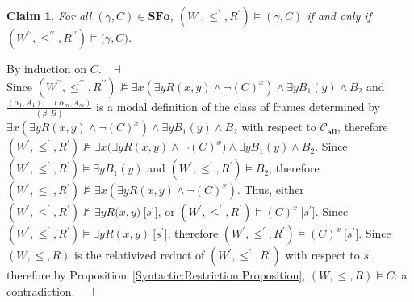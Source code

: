 \documentclass[draft]{article}
\newtheorem{claim}{Claim}
\newenvironment{proof}{{\bf Proof:}}{~$\dashv$\\}
\def\SFo{\mathbf{SFo}}
\def\allfra{\mathbf{all}}
\begin{document}
\begin{proof}
%
%
\begin{claim}
%
%
For all $(\gamma,C){\in}\SFo$, $(W^{\prime},{\leq^{\prime}},{R^{\prime}}){\models}(\gamma,C)$ if and only if $(W^{\prime\prime},{\leq^{\prime\prime}},{R^{\prime\prime}}){\models}(\gamma,
%
%
%
%
%
%
%
$\linebreak$
%
%
%
%
%
%
C)$.
%
%
\end{claim}
%
%
\begin{proof}
%
%
By induction on $C$.
%
%
\medskip
%
%
\end{proof}
%
%
Since $(W^{\prime\prime},{\leq^{\prime\prime}},{R^{\prime\prime}}){\not\models}{\exists x}({\exists y}R(x,y){\wedge}{\neg}(C)^{x}){\wedge}{\exists y}B_{1}(y){\wedge}B_{2}$ and $\frac{(\alpha_{1},A_{1})\ \ldots\ (\alpha_{m},A_{m})}{(\beta,B)}$ is a modal definition of the class of frames determined by ${\exists x}({\exists y}R(x,y){\wedge}{\neg}(C)^{x}){\wedge}
%
%
%
%
%
%
%
$\linebreak$
%
%
%
%
%
%
{\exists y}B_{1}(y){\wedge}B_{2}$ with respect to ${\mathcal C}_{\allfra}$, therefore $(W^{\prime},{\leq^{\prime}},{R^{\prime}}){\not\models}{\exists x}({\exists y}R(x,y){\wedge}
%
%
%
%
%
%
%
$\linebreak$
%
%
%
%
%
%
{\neg}(C)^{x}){\wedge}{\exists y}B_{1}(y){\wedge}B_{2}$.
Since $(W^{\prime},{\leq^{\prime}},{R^{\prime}}){\models}{\exists y}B_{1}(y)$ and $(W^{\prime},{\leq^{\prime}},{R^{\prime}}){\models}B_{2}$, therefore $(W^{\prime},{\leq^{\prime}},{R^{\prime}}){\not\models}{\exists x}({\exists y}R(x,y){\wedge}{\neg}(C)^{x})$.
Thus, either $(W^{\prime},{\leq^{\prime}},{R^{\prime}}){\not\models}{\exists y}R(x,
%
%
%
%
%
%
%
$\linebreak$
%
%
%
%
%
%
y)\ \lbrack s^{\prime}\rbrack$, or $(W^{\prime},{\leq^{\prime}},{R^{\prime}}){\models}(C)^{x}\ \lbrack s^{\prime}\rbrack$.
Since $(W^{\prime},{\leq^{\prime}},{R^{\prime}}){\models}{\exists y}R(x,y)\ \lbrack s^{\prime}\rbrack$, therefore $(W^{\prime},{\leq^{\prime}},{R^{\prime}}){\models}(C)^{x}\ \lbrack s^{\prime}\rbrack$.
Since $(W,{\leq},{R})$ is the relativized reduct of $(W^{\prime},{\leq^{\prime}},{R^{\prime}})$ with respect to $s^{\prime}$, therefore by Proposition~\ref{Syntactic:Restriction:Proposition}, $(W,{\leq},{R}){\models}C$: a contradiction.
%
%
\medskip
%
%
\end{proof}
\end{document}
